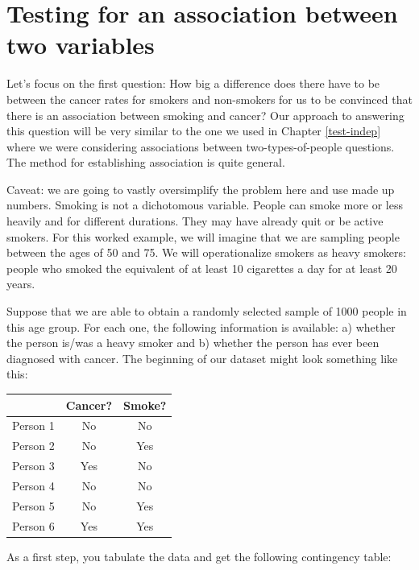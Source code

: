 \documentclass[
  openany]{book}
\begin{document}
\hypertarget{testing-for-an-association-between-two-variables}{%
\section*{Testing for an association between two variables}\label{testing-for-an-association-between-two-variables}}

Let's focus on the first question: How big a difference does there have to be between the cancer rates for smokers and non-smokers for us to be convinced that there is an association between smoking and cancer? Our approach to answering this question will be very similar to the one we used in Chapter \ref{test-indep} where we were considering associations between two-types-of-people questions. The method for establishing association is quite general.

Caveat: we are going to vastly oversimplify the problem here and use made up numbers. Smoking is not a dichotomous variable. People can smoke more or less heavily and for different durations. They may have already quit or be active smokers. For this worked example, we will imagine that we are sampling people between the ages of 50 and 75. We will operationalize smokers as heavy smokers: people who smoked the equivalent of at least 10 cigarettes a day for at least 20 years.

Suppose that we are able to obtain a randomly selected sample of 1000 people in this age group. For each one, the following information is available: a) whether the person is/was a heavy smoker and b) whether the person has ever been diagnosed with cancer. The beginning of our dataset might look something like this:

\begin{longtable}[]{@{}lcc@{}}
\toprule()
& Cancer? & Smoke? \\
\midrule()
\endhead
Person 1 & No & No \\
Person 2 & No & Yes \\
Person 3 & Yes & No \\
Person 4 & No & No \\
Person 5 & No & Yes \\
Person 6 & Yes & Yes \\
\bottomrule()
\end{longtable}

As a first step, you tabulate the data and get the following contingency table:
\end{document}
